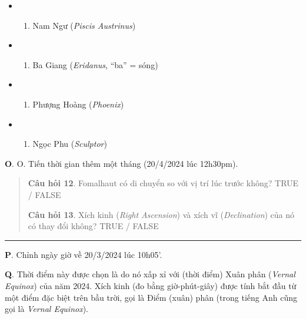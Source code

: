 \documentclass[
  a4paper,
]{book}
\providecommand{\tightlist}{%
  \setlength{\itemsep}{0pt}\setlength{\parskip}{0pt}}
\begin{document}
\begin{itemize}
\tightlist
\item
  \begin{enumerate}
  \def\labelenumi{(\Alph{enumi})}
  \tightlist
  \item
    Nam Ngư (\emph{Piscis Austrinus})\\
  \end{enumerate}
\item
  \begin{enumerate}
  \def\labelenumi{(\Alph{enumi})}
  \setcounter{enumi}{1}
  \tightlist
  \item
    Ba Giang (\emph{Eridanus}, ``ba'' = sóng)\\
  \end{enumerate}
\item
  \begin{enumerate}
  \def\labelenumi{(\Alph{enumi})}
  \setcounter{enumi}{2}
  \tightlist
  \item
    Phượng Hoàng (\emph{Phoenix})\\
  \end{enumerate}
\item
  \begin{enumerate}
  \def\labelenumi{(\Alph{enumi})}
  \setcounter{enumi}{3}
  \tightlist
  \item
    Ngọc Phu (\emph{Sculptor})
  \end{enumerate}
\end{itemize}

\textbf{O}. O. Tiến thời gian thêm một tháng (20/4/2024 lúc 12h30pm).

\begin{quote}
\textbf{Câu hỏi 12}. Fomalhaut có di chuyển so với vị trí lúc trước không?
TRUE / FALSE

\textbf{Câu hỏi 13}. Xích kinh (\emph{Right Ascension}) và xích vĩ (\emph{Declination}) của nó có thay đổi không?
TRUE / FALSE
\end{quote}

\begin{center}\rule{0.5\linewidth}{0.5pt}\end{center}

\textbf{P}. Chỉnh ngày giờ về 20/3/2024 lúc 10h05'.

\textbf{Q}. Thời điểm này được chọn là do nó xấp xỉ với (thời điểm) Xuân phân (\emph{Vernal Equinox}) của năm 2024. Xích kinh (đo bằng giờ-phút-giây) được tính bắt đầu từ một điểm đặc biệt trên bầu trời, gọi là Điểm (xuân) phân (trong tiếng Anh cũng gọi là \emph{Vernal Equinox}).
\end{document}
